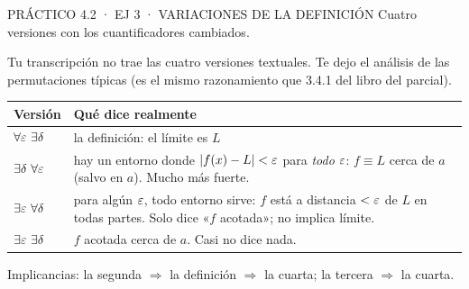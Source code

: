 \begin{enunciado}{PRÁCTICO 4.2 · EJ 3 · VARIACIONES DE LA DEFINICIÓN}
Cuatro versiones con los cuantificadores cambiados.
\end{enunciado}
\begin{falta}
Tu transcripción no trae las cuatro versiones textuales. Te dejo el análisis de las permutaciones típicas (es el mismo razonamiento que 3.4.1 del libro del parcial).
\end{falta}
\begin{center}\small
\begin{tabularx}{\linewidth}{@{}l X@{}}\toprule
Versión & Qué dice realmente\\\midrule
$\forall\eps\ \exists\delta$ & la definición: el límite es $L$\\
$\exists\delta\ \forall\eps$ & hay un entorno donde $|f(x)-L|<\varepsilon$ para \emph{todo} $\varepsilon$: $f\equiv L$ cerca de $a$ (salvo en $a$). Mucho más fuerte.\\
$\exists\eps\ \forall\delta$ & para algún $\varepsilon$, todo entorno sirve: $f$ está a distancia $<\varepsilon$ de $L$ en todas partes. Solo dice «$f$ acotada»; no implica límite.\\
$\exists\eps\ \exists\delta$ & $f$ acotada cerca de $a$. Casi no dice nada.\\\bottomrule
\end{tabularx}
\end{center}
Implicancias: la segunda $\Rightarrow$ la definición $\Rightarrow$ la cuarta; la tercera $\Rightarrow$ la cuarta.

